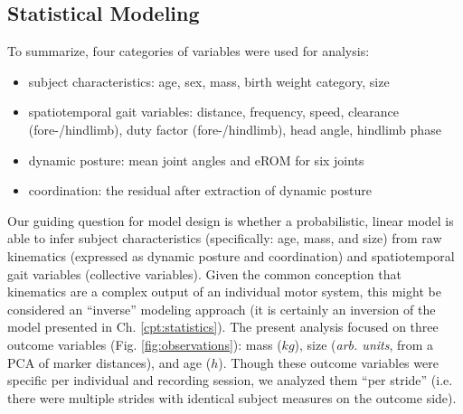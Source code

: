 \subsection{Statistical Modeling}
\label{sec:org7326405}
To summarize, four categories of variables were used for analysis:
\begin{itemize}
\item subject characteristics: age, sex, mass, birth weight category, size
\item spatiotemporal gait variables: distance, frequency, speed, clearance (fore-/hindlimb), duty factor (fore-/hindlimb), head angle, hindlimb phase
\item dynamic posture: mean joint angles and eROM for six joints
\item coordination: the residual after extraction of dynamic posture
\end{itemize}

Our guiding question for model design is whether a probabilistic, linear model is able to infer subject characteristics (specifically: age, mass, and size) from raw kinematics (expressed as dynamic posture and coordination) and spatiotemporal gait variables (collective variables).
Given the common conception that kinematics are a complex output of an individual motor system, this might be considered an ``inverse'' modeling approach (it is certainly an inversion of the model presented in Ch. \ref{cpt:statistics}).
The present analysis focused on three outcome variables (Fig. \ref{fig:observations}): mass (\(kg\)), size (\emph{arb. units}, from a PCA of marker distances), and age (\(h\)).
Though these outcome variables were specific per individual and recording session, we analyzed them ``per stride'' (i.e. there were multiple strides with identical subject measures on the outcome side).


